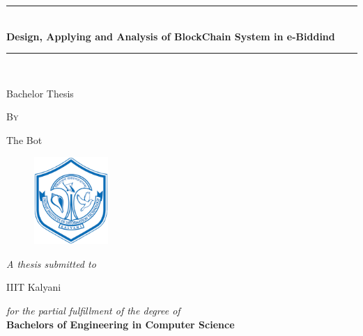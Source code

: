 \documentclass[a4paper,12pt]{report}
\newcommand{\HRule}{\rule{\linewidth}{0.5mm}}
\begin{document}
\begin{titlepage}
\begin{center}
\HRule \\[0.4cm]
{\huge \bfseries \textbf{Design, Applying and Analysis of BlockChain System in e-Biddind}  \\[0.4cm] }
\HRule \\[1cm]
\end{center}
\vspace{0.2cm}
\begin{center}
{\large{Bachelor Thesis}}
\end{center}
\vspace{0.25cm}
\begin{center}
{\large {\textsc{By}}}
\end{center}
\vspace{0.35cm}
\begin{center}
{\large{The Bot}}
\end{center}
\vspace{0.25cm}

\begin{figure}[h]
    \centering
        \includegraphics[width=0.25\textwidth]{iiitk}
\end{figure}

\vspace{0.5cm}

\begin{center}
{\textit{\Large{A thesis submitted to}}}\\
\end{center}

\vspace{0.25cm}

\begin{center}
{\Large{IIIT Kalyani}}\\
\end{center}

\vspace{0.35cm}

\begin{center}
\textit{\large {for the partial fulfillment of the degree of}}\\
\vspace{0.8cm}
\textbf{\Large{Bachelors of Engineering in Computer Science}}\\
\end{center}


\end{titlepage}
\end{document}
